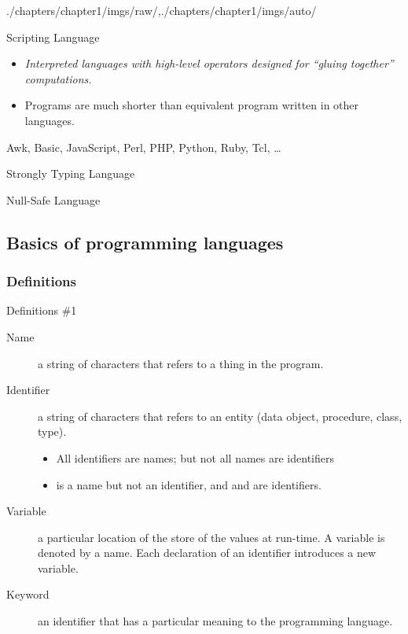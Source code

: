 \begin{graphicspathcontext}{{./chapters/chapter1/imgs/raw/},{./chapters/chapter1/imgs/auto/}}
\begin{bibunit}[apalike]

\begin{frame}{Scripting Language}
	\begin{itemize}
	\item \emph{Interpreted languages with high-level operators designed for ``gluing together'' computations.}
	\vfill
	\item Programs are much shorter than equivalent program written in other languages.
	\end{itemize}
	\vfill
	\begin{examples}
		Awk, Basic, JavaScript, Perl, PHP, Python, Ruby, Tcl, \dots
	\end{examples}
\end{frame}

\begin{frame}{Strongly Typing Language}
\end{frame}
	
\begin{frame}{Null-Safe Language}
\end{frame}

\subsection{Basics of programming languages}


\subsubsection{Definitions}

\begin{frame}{Definitions \#1}
	\begin{description}
	\item[Name] a string of characters that refers to a thing in the program.
	\item[Identifier] a string of characters that refers to an entity (data object, procedure, class, type). \begin{itemize}
		\item All identifiers are names; but not all names are identifiers
		\item {} is a name but not an identifier, and  and  are identifiers.
		\end{itemize}
	\item[Variable] a particular location of the store of the values at run-time. A variable is denoted by a name. Each declaration of an identifier introduces a new variable.
	\item[Keyword] an identifier that has a particular meaning to the programming language.
	\end{description}
\end{frame}


\end{bibunit}
\end{graphicspathcontext}
